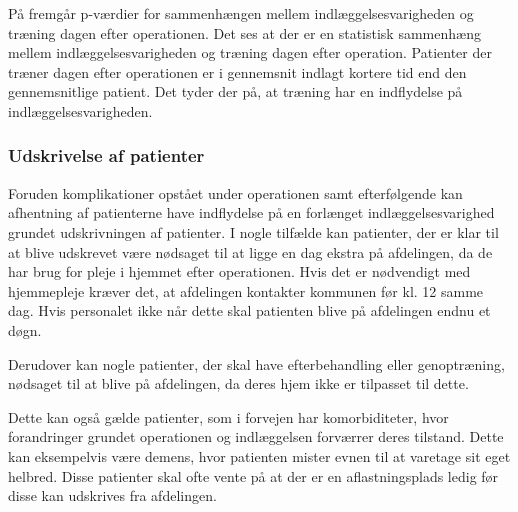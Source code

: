 \noident 
På  fremgår p-værdier for sammenhængen mellem indlæggelsesvarigheden og træning dagen efter operationen. Det ses at der er en statistisk sammenhæng mellem indlæggelsesvarigheden og træning dagen efter operation. Patienter der træner dagen efter operationen er i gennemsnit indlagt kortere tid end den gennemsnitlige patient. Det tyder der på, at træning har en indflydelse på indlæggelsesvarigheden. 


\subsubsection{Udskrivelse af patienter}
Foruden komplikationer opstået under operationen samt efterfølgende kan afhentning af patienterne have indflydelse på en forlænget indlæggelsesvarighed grundet udskrivningen af patienter. I nogle tilfælde kan patienter, der er klar til at blive udskrevet være nødsaget til at ligge en dag ekstra på afdelingen, da de har brug for pleje i hjemmet efter operationen. Hvis det er nødvendigt med hjemmepleje kræver det, at afdelingen kontakter kommunen før kl. 12 samme dag. Hvis personalet ikke når dette skal patienten blive på afdelingen endnu et døgn. 

Derudover kan nogle patienter, der skal have efterbehandling eller genoptræning,  nødsaget til at blive på afdelingen, da deres hjem ikke er tilpasset til dette. 

Dette kan også gælde patienter, som i forvejen har komorbiditeter, hvor forandringer grundet operationen og indlæggelsen forværrer deres tilstand. Dette kan eksempelvis være demens, hvor patienten mister evnen til at varetage sit eget helbred. Disse patienter skal ofte vente på at der er en aflastningsplads ledig før disse kan udskrives fra afdelingen. 


